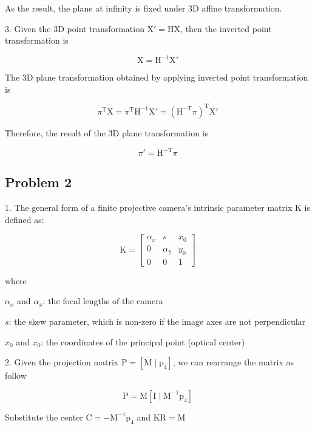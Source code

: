 \documentclass[conference]{IEEEtran}
\begin{document}
As the result, the plane at infinity is fixed under 3D affine transformation. 

3. Given the 3D point transformation \( \mathrm{X}{'} = \mathrm{H}\mathrm{X} \), then the inverted point transformation is 

\[\mathrm{X} = \mathrm{H}^{-1}\mathrm{X}{'}\]

The 3D plane transformation obtained by applying inverted point transformation is

\[\pi^\mathrm{T}\mathrm{X} = \pi^\mathrm{T}\mathrm{H}^{-1}\mathrm{X}{'} =
{(\mathrm{H}^\mathrm{-T}\pi)}^\mathrm{T}\mathrm{X}{'} \]

Therefore, the result of the 3D plane transformation is 

\[\pi{'} = \mathrm{H}^\mathrm{-T}\pi \]

\subsection{Problem 2}

1. The general form of a finite projective camera's intrinsic parameter matrix \( \mathrm{K} \) is defined as:

\[ \mathrm{K} = \begin{bmatrix}
\alpha_x & s & x_0  \\
 0 & \alpha_y & y_0  \\
 0 & 0 & 1 
\end{bmatrix}\]

where 

\begin{description}[font=$\bullet$~\normalfont\scshape\color{red!50!black}]
  \item \( \alpha_x \) and \( \alpha_x \): the focal lengths of the camera
  \item \( s \): the skew parameter, which is non-zero if the image axes are not perpendicular
  \item \( x_0 \) and \( x_0 \): the coordinates of the principal point (optical center)
\end{description}
 


2. Given the projection matrix \( \mathrm{P} = [\mathrm{M}\mid\mathrm{p}_4] \), we can rearrange the matrix as follow

\[ \mathrm{P} = \mathrm{M}[\mathrm{I}\mid\mathrm{M}^{-1}\mathrm{p}_4] \]

Substitute the center \( \mathrm{C} = -\mathrm{M}^{-1}\mathrm{p}_4 \) and \( \mathrm{K}\mathrm{R} = \mathrm{M}\)
\end{document}
